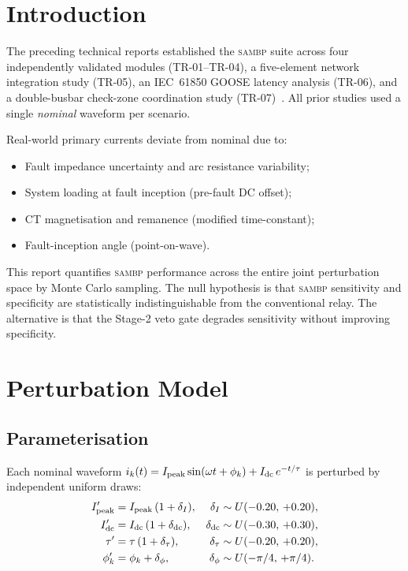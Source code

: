\documentclass[12pt,a4paper]{article}
\newcommand{\SAMBP}{\textsc{sambp}}
\newcommand{\Ipeak}{I_{\rm peak}}
\begin{document}
\section{Introduction}

The preceding technical reports established the \SAMBP{} suite across
four independently validated modules (TR-01–TR-04), a five-element
network integration study (TR-05), an IEC~61850 GOOSE latency analysis
(TR-06), and a double-busbar check-zone coordination study
(TR-07)~\citep{SAMBP_TR05,SAMBP_TR06,SAMBP_TR07}.  All prior studies
used a single \emph{nominal} waveform per scenario.

Real-world primary currents deviate from nominal due to:
\begin{itemize}[noitemsep]
  \item Fault impedance uncertainty and arc resistance variability;
  \item System loading at fault inception (pre-fault DC offset);
  \item CT magnetisation and remanence (modified time-constant);
  \item Fault-inception angle (point-on-wave).
\end{itemize}

This report quantifies \SAMBP{} performance across the entire joint
perturbation space by Monte Carlo sampling.  The null hypothesis is that
\SAMBP{} sensitivity and specificity are statistically indistinguishable
from the conventional relay.  The alternative is that the Stage-2 veto
gate degrades sensitivity without improving specificity.


\section{Perturbation Model}

\subsection{Parameterisation}

Each nominal waveform $i_k(t) = \Ipeak \sin(\omega t + \phi_k) +
I_{\rm dc}\,e^{-t/\tau}$ is perturbed by independent uniform draws:
\begin{align}
  \Ipeak' &= \Ipeak\,(1 + \delta_I), &
    \delta_I &\sim U(-0.20,\,+0.20), \label{eq:dI}\\
  I_{\rm dc}' &= I_{\rm dc}\,(1 + \delta_{\rm dc}), &
    \delta_{\rm dc} &\sim U(-0.30,\,+0.30), \label{eq:dDC}\\
  \tau' &= \tau\,(1 + \delta_\tau), &
    \delta_\tau &\sim U(-0.20,\,+0.20), \label{eq:dtau}\\
  \phi_k' &= \phi_k + \delta_\phi, &
    \delta_\phi &\sim U(-\pi/4,\,+\pi/4). \label{eq:dphi}
\end{align}
\end{document}
